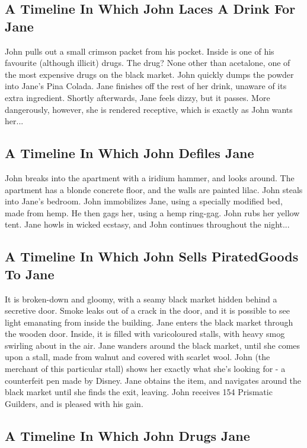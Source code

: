 \documentclass{article}
\begin{document}
\subsection{A Timeline In Which John Laces A Drink For Jane}


John pulls out a small crimson packet from his pocket. Inside is one of his favourite (although illicit) drugs.
The drug? None other than acetalone, one of the most expensive drugs on the black market.
John quickly dumps the powder into Jane's Pina Colada.
Jane finishes off the rest of her drink, unaware of its extra ingredient.
Shortly afterwards, Jane feels dizzy, but it passes.
More dangerously, however, she is rendered receptive, which is exactly as John wants her...
\subsection{A Timeline In Which John Defiles Jane}


John breaks into the apartment with a iridium hammer, and looks around.
The apartment has a blonde concrete floor, and the walls are painted lilac.
John steals into Jane's bedroom.
John immobilizes Jane, using a specially modified bed, made from hemp.
He then gags her, using a hemp ring{-}gag.
John rubs her yellow tent.
Jane howls in wicked ecstasy, and John continues throughout the night...
\subsection{A Timeline In Which John Sells PiratedGoods To Jane}


It is broken{-}down and gloomy, with a seamy black market hidden behind a secretive door.
Smoke leaks out of a crack in the door, and it is possible to see light emanating from inside the building.
Jane enters the black market through the wooden door.
Inside, it is filled with varicoloured stalls, with heavy smog swirling about in the air.
Jane wanders around the black market, until she comes upon a stall, made from walnut and covered with scarlet wool.
John (the merchant of this particular stall) shows her exactly what she's looking for {-} a counterfeit pen made by Disney.
Jane obtains the item, and navigates around the black market until she finds the exit, leaving.
John receives 154 Prismatic Guilders, and is pleased with his gain.
\subsection{A Timeline In Which John Drugs Jane}
\end{document}
